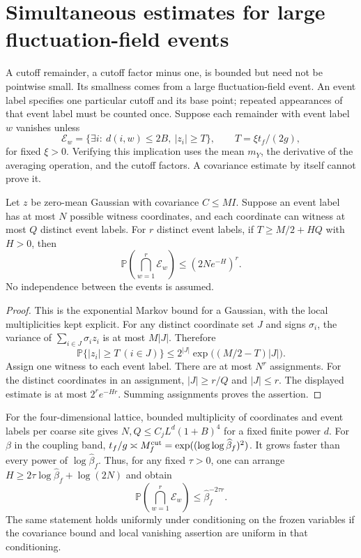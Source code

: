 \section{Simultaneous estimates for large fluctuation-field events}

A cutoff remainder, a cutoff factor minus one, is bounded but need not be pointwise small. Its
smallness comes from a large fluctuation-field event. An event label specifies one
particular cutoff and its base point; repeated appearances of that event label
must be counted once. Suppose each remainder with event label $w$ vanishes
unless
\begin{equation}
 \mathcal E_w=\{\exists i:\ d(i,w)\le 2B,
                                   \ |z_i|\ge T\},\qquad
 T=\xi t_f/(2g),
 \label{ch06:tail-event}
\end{equation}
for fixed $\xi>0$. Verifying this implication uses the mean $m_Y$, the
derivative of the averaging operation, and the cutoff factors. A covariance estimate by itself cannot
prove it.

\begin{lemma}
\label{ch06:joint-tails}
Let $z$ be zero-mean Gaussian with covariance $C\le M I$. Suppose an
event label has at most $N$ possible witness coordinates, and each coordinate
can witness at most $Q$ distinct event labels. For $r$ distinct event labels,
if $T\ge M/2+HQ$ with $H>0$, then
\[
 \mathbb P\left(\bigcap_{w=1}^r\mathcal E_w\right)
                                      \le(2N e^{-H})^r.
\]
No independence between the events is assumed.
\end{lemma}
\begin{proof}
This is the exponential Markov bound for a Gaussian, with the local
multiplicities kept explicit. For any distinct coordinate set $J$ and
signs $\sigma_i$, the variance of $\sum_{i\in J}\sigma_i z_i$ is at most
$M|J|$. Therefore
\[
 \mathbb P\{|z_i|\ge T\ (i\in J)\}
            \le2^{|J|}\exp\bigl((M/2-T)|J|\bigr).
\]
Assign one witness to each event label. There are at most $N^r$ assignments.
For the distinct coordinates in an assignment, $|J|\ge r/Q$ and
$|J|\le r$. The displayed estimate is at most $2^re^{-Hr}$.
Summing assignments proves the assertion.
\end{proof}

For the four-dimensional lattice, bounded multiplicity of coordinates
and event labels per coarse site gives $N,Q\le C_jL^d(1+B)^4$ for a fixed
finite power $d$. For $\beta$ in the coupling band,
$t_f/g\asymp M_f^{\rm cut}=\exp((\log\log\widehat\beta_f)^2)$.
It grows faster than every power of $\log\widehat\beta_f$. Thus, for any
fixed $\tau>0$, one can arrange
$H\ge2\tau\log\widehat\beta_f+\log(2N)$ and obtain
\begin{equation}
 \mathbb P\left(\bigcap_{w=1}^r\mathcal E_w\right)
                                      \le\widehat\beta_f^{-2\tau r}.
 \label{ch06:power-tail}
\end{equation}
The same statement holds uniformly under conditioning on the frozen variables if the
covariance bound and local vanishing assertion are uniform in that
conditioning.

